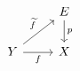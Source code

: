 \documentclass{article}
\begin{document}
    \begin{equation*}
        \begin{tikzcd}
            & E \ar[d, "p"] \\
            Y \ar[r, "f"'] \ar[ur, "\widetilde{f}"] & X
        \end{tikzcd}
    \end{equation*}
\end{document}
